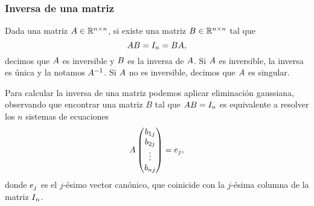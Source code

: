     \subsubsection{Inversa de una matriz}

Dada una matriz $\Ab \in \R^{n \times n}$, si existe una matriz $\Bb \in \R^{n\times n}$ tal que
$$
\Ab\Bb = \Id_n = \Bb\Ab,
$$
decimos que $\Ab$ es inversible y $\Bb$ es la inversa de $\Ab$. Si $\Ab$ es inversible, la inversa es única y la notamos $\Ab^{-1}$. Si $\Ab$ no es inversible, decimos que $\Ab$ es singular.

Para calcular la inversa de una matriz podemos aplicar eliminación gaussiana, observando que encontrar una matriz $B$ tal que $\Ab \Bb = \Id_n$ es equivalente a resolver los $n$ sistemas de ecuaciones
$$
\Ab \begin{pmatrix} b_{1j} \\ b_{2j} \\ \vdots \\ b_{nj} \end{pmatrix} = \eb_j,
$$
donde $\eb_j$ es el $j$-ésimo vector canónico, que coinicide con la $j$-ésima columna de la matriz $\Id_n$.


